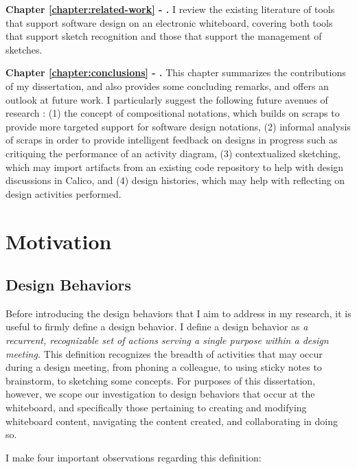 \documentclass[12pt,fleqn]{ucithesis}
\begin{document}
\textbf{Chapter \ref{chapter:related-work} - .} I review the existing literature of tools that support software design on an electronic whiteboard, covering both tools that support sketch recognition and those that support the management of sketches.

\textbf{Chapter \ref{chapter:conclusions} - .} This chapter summarizes the contributions of my dissertation, and also provides some concluding remarks, and offers an outlook at future work. I particularly suggest the following future avenues of research : (1) the concept of compositional notations, which builds on scraps to provide more targeted support for software design notations, (2) informal analysis of scraps in order to provide intelligent feedback on designs in progress such as critiquing the performance of an activity diagram, (3) contextualized sketching, which may import artifacts from an existing code repository to help with design discussions in Calico, and (4) design histories, which may help with reflecting on design activities performed.

 \newpage 
 \newpage \chapter{Motivation}
\label{chapter:motivation}

\section{Design Behaviors}

Before introducing the design behaviors that I aim to address in my research, it is useful to firmly define a design behavior. I define a design behavior as \emph{a recurrent, recognizable set of actions serving a single purpose within a design meeting.} This definition recognizes the breadth of activities that may occur during a design meeting, from phoning a colleague, to using sticky notes to brainstorm, to sketching some concepts.  For purposes of this dissertation, however, we scope our investigation to design behaviors that occur at the whiteboard, and specifically those pertaining to creating and modifying whiteboard content, navigating the content created, and collaborating in doing so.

I make four important observations regarding this definition:
\end{document}

